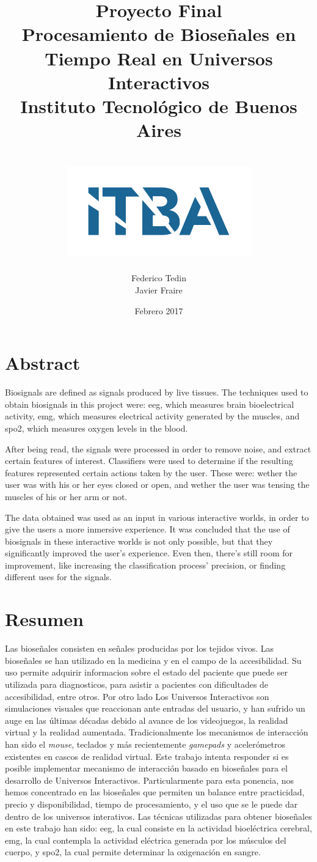 \documentclass[a4paper]{report}
\title{
	{\LARGE Proyecto Final}\\
	{\Huge Procesamiento de Bioseñales en Tiempo Real en Universos Interactivos}\\
	{\large Instituto Tecnológico de Buenos Aires}\\~\\
	{\includegraphics{itba.png}}
}
\author{{Federico Tedin} \\ {Javier Fraire}}
\date{Febrero 2017}
\begin{document}
\maketitle

\chapter*{Abstract}
\justifying
Biosignals are defined as signals produced by live tissues. The techniques used to obtain biosignals in this project were: \acrshort{eeg}, which measures brain bioelectrical activity, \acrshort{emg}, which measures electrical activity generated by the muscles, and \acrshort{spo2}, which measures oxygen levels in the blood.

After being read, the signals were processed in order to remove noise, and extract certain features of interest. Classifiers were used to determine if the resulting features represented certain actions taken by the user. These were: wether the user was with his or her eyes closed or open, and wether the user was tensing the muscles of his or her arm or not.

The data obtained was used as an input in various interactive worlds, in order to give the users a more inmersive experience. It was concluded that the use of biosignals in these interactive worlds is not only possible, but that they significantly improved the user's experience. Even then, there's still room for improvement, like increasing the classification process' precision, or finding different uses for the signals.

\chapter*{Resumen}
Las bioseñales consisten en señales producidas por los tejidos vivos. Las bioseñales se han utilizado en la medicina y en el campo de la accesibilidad. Su uso permite adquirir informacion sobre el estado del paciente que puede ser utilizada para diagnosticos, para asistir a pacientes con dificultades de accesibilidad, entre otros. Por otro lado Los Universos Interactivos son simulaciones visuales que reaccionan ante entradas del usuario, y han sufrido un auge en las últimas décadas debido al avance de los videojuegos, la realidad virtual y la realidad aumentada.  Tradicionalmente los mecanismos de interacción han sido el \emph{mouse}, teclados y más recientemente \emph{gamepads} y acelerómetros existentes en cascos de realidad virtual.  Este trabajo intenta responder si es posible implementar mecanismo de interacción basado en bioseñales para el desarrollo de Universos Interactivos.  Particularmente para esta ponencia, nos hemos concentrado en las bioseñales que permiten un balance entre practicidad, precio y disponibilidad, tiempo de procesamiento, y el uso que se le puede dar dentro de los universos interativos. Las técnicas utilizadas para obtener bioseñales en este trabajo han sido: \gls{eeg}, la cual consiste en la actividad bioeléctrica cerebral, \gls{emg}, la cual contempla la actividad eléctrica generada por los músculos del cuerpo, y \gls{spo2}, la cual permite determinar la oxigenación en sangre.
\end{document}
